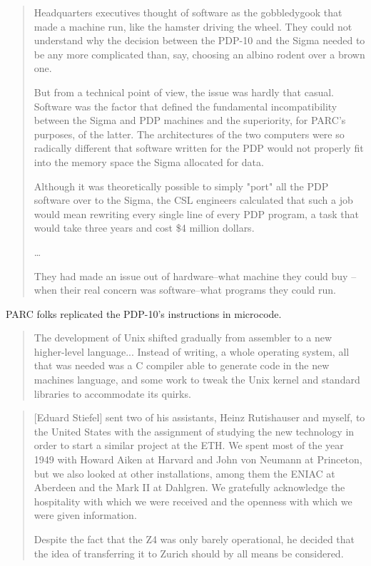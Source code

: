 \begin{quotation}
    Headquarters executives thought of software as the gobbledygook that made a machine run,
    like the hamster driving the wheel. They could not understand why the decision between the PDP-10
    and the Sigma needed to be any more complicated than, say, choosing an albino rodent over a brown one.

    But from a technical point of view, the issue was hardly that casual.
    Software was the factor that defined the fundamental incompatibility between the Sigma and PDP machines
    and the superiority, for PARC's purposes, of the latter.
    The architectures of the two computers were so radically different that software written for the PDP would not
    properly fit into the memory space the Sigma allocated for data.

    Although it was theoretically possible to simply "port" all the PDP software over to the Sigma, the CSL
    engineers calculated that such a job would mean rewriting every single line of every PDP program,
    a task that would take three years and cost \$4 million dollars.

    \dots

    They had made an issue out of hardware--what machine they could buy
    --when their real concern was software--what programs they could run.
\end{quotation}

PARC folks replicated the PDP-10's instructions in microcode.


\begin{quotation}
The development of Unix shifted gradually from assembler to a new higher-level language...
Instead of writing, a whole operating system, all that was needed was a C compiler able to
generate code in the new machines language, and some work to tweak the Unix kernel and
standard libraries to accommodate its quirks.
\end{quotation}

\begin{quotation}
    [Eduard Stiefel] sent two of his assistants, Heinz Rutishauser and myself,
to the United States with the assignment of studying the new technology in order to start a similar project at
the ETH. We spent most of the year 1949 with Howard Aiken at Harvard and John von Neumann at
Princeton, but we also looked at other installations, among them the ENIAC at Aberdeen and the Mark II at
Dahlgren. We gratefully acknowledge the hospitality with which we were received and the openness with
which we were given information.

Despite the fact that the Z4 was only barely operational, he decided that the idea of transferring it to Zurich
should by all means be considered.
\end{quotation}

